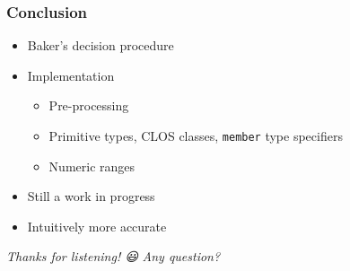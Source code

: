 \documentclass[aspectratio=169]{beamer}
\renewcommand\code[1]{\texttt{#1}}
\newcommand\emoji[2][\tiny]{{#1#2}}
\begin{document}
\begin{frame}[standout]
  \frametitle{Conclusion}
  \begin{itemize}
  \item Baker's decision procedure
  \item Implementation
    \begin{itemize}
    \item Pre-processing
    \item Primitive types, CLOS classes, \code{member} type specifiers
    \item Numeric ranges
    \end{itemize}
  \item Still a work in progress
  \item Intuitively more accurate
  \end{itemize}
\end{frame}

\begin{sectionframe}{\it Thanks for listening! \emoji[\normalsize]{😃}}
  \it Any question?
\end{sectionframe}
\end{document}
